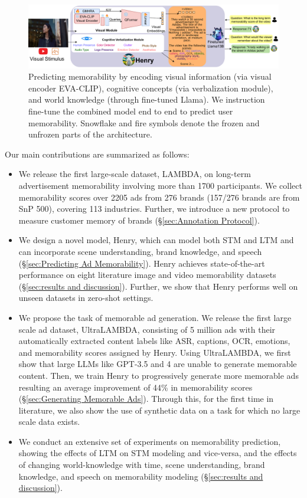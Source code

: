 \begin{figure}[!t]
    \centering
    \includegraphics[width=\textwidth]{images/architecture.pdf}
    \caption{Predicting memorability by encoding visual information (via visual encoder EVA-CLIP), cognitive concepts (via verbalization module), and world knowledge (through fine-tuned Llama). We instruction fine-tune the combined model end to end to predict user memorability. Snowflake and fire symbols denote the frozen and unfrozen parts of the architecture.}
    \label{fig:memorability-model}
\end{figure}



Our main contributions are summarized as follows:
\begin{itemize}[leftmargin=*]
    \item We release the first large-scale dataset, LAMBDA, on long-term advertisement memorability involving more than 1700 participants. We collect memorability scores over 2205 ads from 276 brands (157/276 brands are from SnP 500), covering 113 industries. Further, we introduce a new protocol to measure customer memory of brands (\S\ref{sec:Annotation Protocol}).
    \item We design a novel model, Henry, which can model both STM and LTM and can incorporate scene understanding, brand knowledge, and speech (\S\ref{sec:Predicting Ad Memorability}). Henry achieves state-of-the-art performance on eight literature image and video memorability datasets (\S\ref{sec:results and discussion}). Further, we show that Henry performs well on unseen datasets in zero-shot settings.
    \item We propose the task of memorable ad generation. We release the first large scale ad dataset, UltraLAMBDA, consisting of 5 million ads with their automatically extracted content labels like ASR, captions, OCR, emotions, and memorability scores assigned by Henry. Using UltraLAMBDA, we first show that large LLMs like GPT-3.5 and 4 are unable to generate memorable content. Then, we train Henry to progressively generate more memorable ads resulting an average improvement of 44\% in memorability scores (\S\ref{sec:Generating Memorable Ads}). Through this, for the first time in literature, we also show the use of synthetic data on a task for which no large scale data exists.
    \item We conduct an extensive set of experiments on memorability prediction, showing the effects of LTM on STM modeling and vice-versa, and the effects of changing world-knowledge with time, scene understanding, brand knowledge, and speech on memorability modeling (\S\ref{sec:results and discussion}).\\
\end{itemize}


